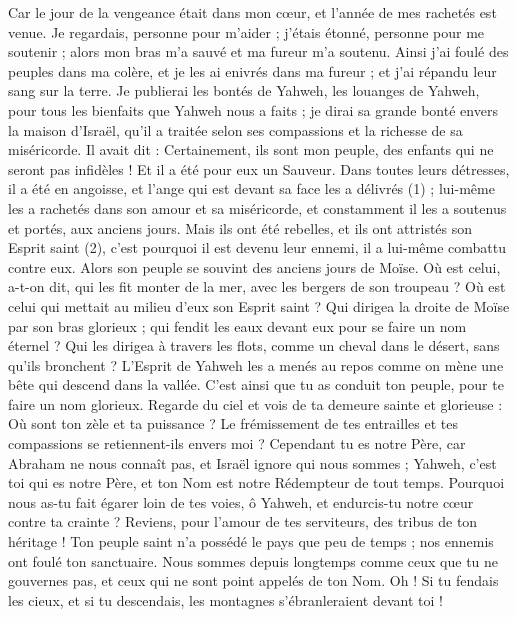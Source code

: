 \begin{multicols}{2}
{Car le jour de la vengeance était dans mon cœur, et l'année de mes rachetés est venue.
Je regardais, personne pour m’aider ; j’étais étonné, personne pour me soutenir ; alors mon bras m'a sauvé et ma fureur m'a soutenu.
Ainsi j'ai foulé des peuples dans ma colère, et je les ai enivrés dans ma fureur ; et j'ai répandu leur sang sur la terre.
Je publierai les bontés de Yahweh, les louanges de Yahweh, pour tous les bienfaits que Yahweh nous a faits ; je dirai sa grande bonté envers la maison d’Israël, qu’il a traitée selon ses compassions et la richesse de sa miséricorde.
Il avait dit : Certainement, ils sont mon peuple, des enfants qui ne seront pas infidèles ! Et il a été pour eux un Sauveur.
Dans toutes leurs détresses, il a été en angoisse, et l'ange qui est devant sa face les a délivrés (1) ; lui-même les a rachetés dans son amour et sa miséricorde, et constamment il les a soutenus et portés, aux anciens jours.
Mais ils ont été rebelles, et ils ont attristés son Esprit saint (2), c'est pourquoi il est devenu leur ennemi, il a lui-même combattu contre eux.
Alors son peuple se souvint des anciens jours de Moïse. Où est celui, a-t-on dit, qui les fit monter de la mer, avec les bergers de son troupeau ? Où est celui qui mettait au milieu d'eux son Esprit saint ?
Qui dirigea la droite de Moïse par son bras glorieux ; qui fendit les eaux devant eux pour se faire un nom éternel ?
Qui les dirigea à travers les flots, comme un cheval dans le désert, sans qu’ils bronchent ?
L'Esprit de Yahweh les a menés au repos comme on mène une bête qui descend dans la vallée. C’est ainsi que tu as conduit ton peuple, pour te faire un nom glorieux.
Regarde du ciel et vois de ta demeure sainte et glorieuse : Où sont ton zèle et ta puissance ? Le frémissement de tes entrailles et tes compassions se retiennent-ils envers moi ?
Cependant tu es notre Père, car Abraham ne nous connaît pas, et Israël ignore qui nous sommes ; Yahweh, c'est toi qui es notre Père, et ton Nom est notre Rédempteur de tout temps.
Pourquoi nous as-tu fait égarer loin de tes voies, ô Yahweh, et endurcis-tu notre cœur contre ta crainte ? Reviens, pour l’amour de tes serviteurs, des tribus de ton héritage !
Ton peuple saint n’a possédé le pays que peu de temps ; nos ennemis ont foulé ton sanctuaire.
Nous sommes depuis longtemps comme ceux que tu ne gouvernes pas, et ceux qui ne sont point appelés de ton Nom. Oh ! Si tu fendais les cieux, et si tu descendais, les montagnes s’ébranleraient devant toi !
}
\end{multicols}
